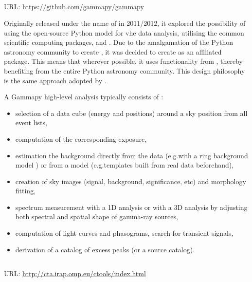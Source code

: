 \subsection{}
\vspace{-0.7em}
\noindent \hspace{\parindent} {\tiny URL: \url{https://github.com/gammapy/gammapy} \par}

\noindent Originally released under the name of  in 2011/2012, it explored the possibility of using the open-source Python model for \gls{vhe} data analysis, utilising the common scientific computing packages,  and  \cite{Deil2017}. Due to the amalgamation of the Python astronomy community to create , it was decided to create  as an  affiliated package. This means that wherever possible, it uses functionality from , thereby benefiting from the entire Python astronomy community. This design philosophy is the same approach adopted by . 

A Gammapy high-level analysis typically consists of \cite[][p. 4]{Deil2017}:
\begin{itemize}
\item selection of a data cube (energy and positions) around a sky position from all event lists,
\item computation of the corresponding exposure,
\item estimation the background directly from the data (e.g.\@ with a ring background model \cite{Berge2007}) or from a model (e.g.\@ templates built from real data beforehand),
\item creation of sky images (signal, background, significance, etc) and morphology fitting,
\item spectrum measurement with a 1D analysis or with a 3D analysis by adjusting both spectral and spatial shape of gamma-ray sources,
\item computation of light-curves and phasograms, search for transient signals,
\item derivation of a catalog of excess peaks (or a source catalog).
\end{itemize}

\subsection{}
\vspace{-0.7em}
\noindent \hspace{\parindent} {\tiny URL: \url{http://cta.irap.omp.eu/ctools/index.html} \par}

